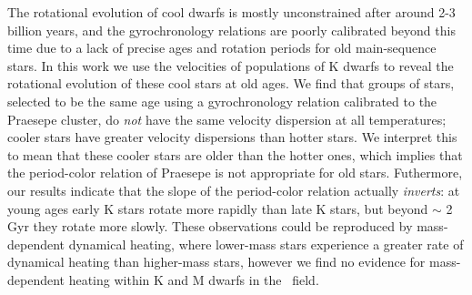 
The rotational evolution of cool dwarfs is mostly unconstrained after around
2-3 billion years, and the gyrochronology relations are poorly calibrated
beyond this time due to a lack of precise ages and rotation periods for old
main-sequence stars.
In this work we use the velocities of populations of K dwarfs to reveal the
rotational evolution of these cool stars at old ages.
We find that groups of stars, selected to be the same age using a
gyrochronology relation calibrated to the Praesepe cluster, do {\it not} have
the same velocity dispersion at all temperatures; cooler stars have greater
velocity dispersions than hotter stars.
We interpret this to mean that these cooler stars are older than the hotter
ones, which implies that the period-color relation of Praesepe is not
appropriate for old stars.
Futhermore, our results indicate that the slope of the period-color relation
actually {\it inverts}: at young ages early K stars rotate more rapidly than
late K stars, but beyond $\sim$ 2 Gyr they rotate more slowly.
These observations could be reproduced by mass-dependent dynamical heating,
where lower-mass stars experience a greater rate of dynamical heating than
higher-mass stars, however we find no evidence for mass-dependent heating
within K and M dwarfs in the \kepler\ field.


